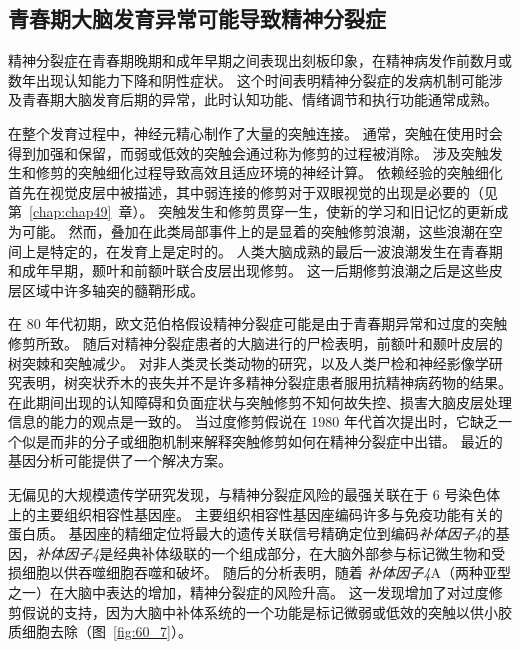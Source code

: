 \subsection{青春期大脑发育异常可能导致精神分裂症}

精神分裂症在青春期晚期和成年早期之间表现出刻板印象，在精神病发作前数月或数年出现认知能力下降和阴性症状。
这个时间表明精神分裂症的发病机制可能涉及青春期大脑发育后期的异常，此时认知功能、情绪调节和执行功能通常成熟。


在整个发育过程中，神经元精心制作了大量的突触连接。
通常，突触在使用时会得到加强和保留，而弱或低效的突触会通过称为修剪的过程被消除。
涉及突触发生和修剪的突触细化过程导致高效且适应环境的神经计算。
依赖经验的突触细化首先在视觉皮层中被描述，其中弱连接的修剪对于双眼视觉的出现是必要的（见第~\ref{chap:chap49}~章）。
突触发生和修剪贯穿一生，使新的学习和旧记忆的更新成为可能。
然而，叠加在此类局部事件上的是显着的突触修剪浪潮，这些浪潮在空间上是特定的，在发育上是定时的。
人类大脑成熟的最后一波浪潮发生在青春期和成年早期，颞叶和前额叶联合皮层出现修剪。
这一后期修剪浪潮之后是这些皮层区域中许多轴突的髓鞘形成。


在 80 年代初期，欧文范伯格假设精神分裂症可能是由于青春期异常和过度的突触修剪所致。
随后对精神分裂症患者的大脑进行的尸检表明，前额叶和颞叶皮层的树突棘和突触减少。
对非人类灵长类动物的研究，以及人类尸检和神经影像学研究表明，树突状乔木的丧失并不是许多精神分裂症患者服用抗精神病药物的结果。
在此期间出现的认知障碍和负面症状与突触修剪不知何故失控、损害大脑皮层处理信息的能力的观点是一致的。
当过度修剪假说在 1980 年代首次提出时，它缺乏一个似是而非的分子或细胞机制来解释突触修剪如何在精神分裂症中出错。
最近的基因分析可能提供了一个解决方案。


无偏见的大规模遗传学研究发现，与精神分裂症风险的最强关联在于 6 号染色体上的主要组织相容性基因座。
主要组织相容性基因座编码许多与免疫功能有关的蛋白质。
基因座的精细定位将最大的遗传关联信号精确定位到编码\textit{补体因子4}的基因，\textit{补体因子4}是经典补体级联的一个组成部分，在大脑外部参与标记微生物和受损细胞以供吞噬细胞吞噬和破坏。
随后的分析表明，随着 \textit{补体因子4}A（两种亚型之一）在大脑中表达的增加，精神分裂症的风险升高。
这一发现增加了对过度修剪假说的支持，因为大脑中补体系统的一个功能是标记微弱或低效的突触以供小胶质细胞去除（图~\ref{fig:60_7}）。


